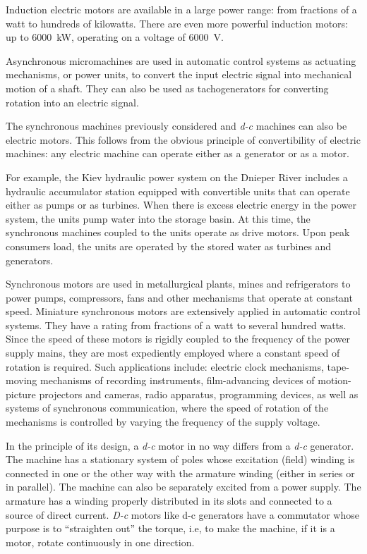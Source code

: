 Induction electric motors are available in a large power range: from fractions of a watt to hundreds of kilowatts. There are even more powerful induction motors: up to \SI{6000}{\kilo\watt}, operating on a voltage of \SI{6000}{\volt}.

Asynchronous micromachines are used in automatic control systems as actuating mechanisms, or power units, to convert the input electric signal into mechanical motion of a shaft. They can also be used as tachogenerators for converting rotation into an electric signal.

The synchronous machines previously considered and \emph{d-c} machines can also be electric motors. This follows from the obvious principle of convertibility of electric machines: any electric machine can operate either as a generator or as a motor.

For example, the Kiev hydraulic power system on the Dnieper River includes a hydraulic accumulator station equipped with convertible units that can operate either as pumps or as turbines. When there is excess electric energy in the power system, the units pump water into the storage basin. At this time, the synchronous machines coupled to the units operate as drive motors. Upon peak consumers load, the units are operated by the stored water as turbines and generators.

Synchronous motors are used in metallurgical plants, mines and refrigerators to power pumps, compressors, fans and other mechanisms that operate at constant speed. Miniature synchronous motors are extensively applied in automatic control systems. They have a rating from fractions of a watt to several hundred watts. Since the speed of these motors is rigidly coupled to the frequency of the power supply mains, they are most expediently employed where a constant speed of rotation is required. Such applications include: electric clock mechanisms, tape-moving mechanisms of recording instruments, film-advancing devices of motion-picture projectors and cameras, radio apparatus, programming devices, as well as systems of synchronous communication, where the speed of rotation of the mechanisms is controlled by varying the frequency of the supply voltage.

In the principle of its design, a \emph{d-c} motor in no way differs from a \emph{d-c} generator. The machine has a stationary system of poles whose excitation (field) winding is connected in one or the other way with the armature winding (either in series or in parallel). The machine can also be separately excited from a power supply. The armature has a winding properly distributed in its slots and connected to a source of direct current. \emph{D-c} motors like d-c generators have a commutator whose purpose is to ``straighten out'' the torque, i.e, to make the machine, if it is a motor, rotate continuously in one direction.


